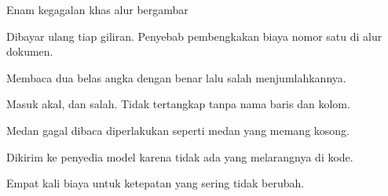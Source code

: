 \documentclass[aspectratio=169,11pt,t]{beamer}
\begin{document}
\begin{frame}[shrink=25]{Enam kegagalan khas alur bergambar}
\begin{minipage}[t]{0.3253\textwidth}
\begin{icardbad}
Dibayar ulang tiap giliran. Penyebab pembengkakan biaya nomor satu di alur dokumen.
\end{icardbad}
\end{minipage}%
\hfill
\begin{minipage}[t]{0.3253\textwidth}
\begin{icardbad}
Membaca dua belas angka dengan benar lalu salah menjumlahkannya.
\end{icardbad}
\end{minipage}%
\hfill
\begin{minipage}[t]{0.3253\textwidth}
\begin{icardbad}
Masuk akal, dan salah. Tidak tertangkap tanpa nama baris dan kolom.
\end{icardbad}
\end{minipage}%


\vskip 4pt

\begin{minipage}[t]{0.3253\textwidth}
\begin{icardbad}
Medan gagal dibaca diperlakukan seperti medan yang memang kosong.
\end{icardbad}
\end{minipage}%
\hfill
\begin{minipage}[t]{0.3253\textwidth}
\begin{icardbad}
Dikirim ke penyedia model karena tidak ada yang melarangnya di kode.
\end{icardbad}
\end{minipage}%
\hfill
\begin{minipage}[t]{0.3253\textwidth}
\begin{icardbad}
Empat kali biaya untuk ketepatan yang sering tidak berubah.
\end{icardbad}
\end{minipage}%
\end{frame}
\end{document}
